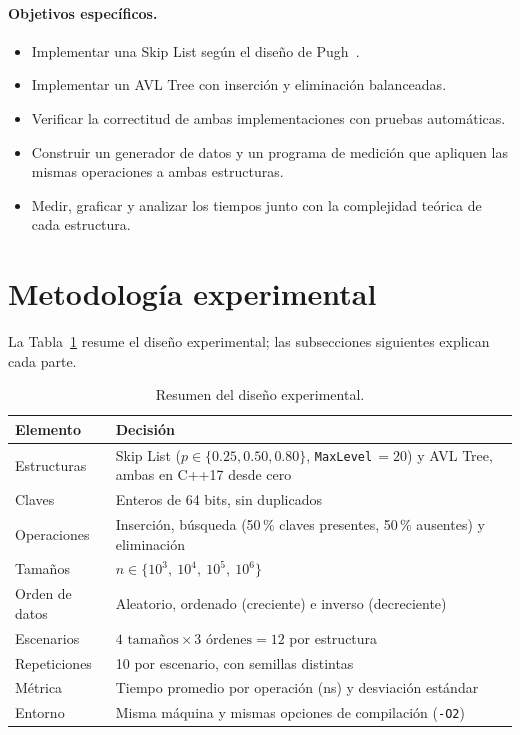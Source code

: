\documentclass[11pt,a4paper]{article}
\begin{document}
\paragraph{Objetivos específicos.}
\begin{itemize}
  \item[\textbf{O1.}] Implementar una Skip List según el diseño de Pugh~\cite{pugh1990}.
  \item[\textbf{O2.}] Implementar un AVL Tree con inserción y eliminación balanceadas.
  \item[\textbf{O3.}] Verificar la correctitud de ambas implementaciones con
  pruebas automáticas.
  \item[\textbf{O4.}] Construir un generador de datos y un programa de
  medición que apliquen las mismas operaciones a ambas estructuras.
  \item[\textbf{O5.}] Medir, graficar y analizar los tiempos junto con la
  complejidad teórica de cada estructura.
\end{itemize}

\section{Metodología experimental}\label{sec:metodo}

La Tabla~\ref{tab:diseno} resume el diseño experimental; las subsecciones
siguientes explican cada parte.

\begin{table}[!htb]
\centering
\renewcommand{\arraystretch}{1.2}
\begin{tabularx}{\textwidth}{l X}
\toprule
\textbf{Elemento} & \textbf{Decisión} \\
\midrule
Estructuras   & Skip List ($p \in \{0.25, 0.50, 0.80\}$, \texttt{MaxLevel}$\,=20$) y AVL Tree, ambas en C++17 desde cero \\
Claves        & Enteros de 64 bits, sin duplicados \\
Operaciones   & Inserción, búsqueda (50\,\% claves presentes, 50\,\% ausentes) y eliminación \\
Tamaños       & $n \in \{10^3,\ 10^4,\ 10^5,\ 10^6\}$ \\
Orden de datos& Aleatorio, ordenado (creciente) e inverso (decreciente) \\
Escenarios    & $4 \text{ tamaños} \times 3 \text{ órdenes} = 12$ por estructura \\
Repeticiones  & 10 por escenario, con semillas distintas \\
Métrica       & Tiempo promedio por operación (ns) y desviación estándar \\
Entorno       & Misma máquina y mismas opciones de compilación (\texttt{-O2}) \\
\bottomrule
\end{tabularx}
\caption{Resumen del diseño experimental.}
\label{tab:diseno}
\end{table}
\end{document}
